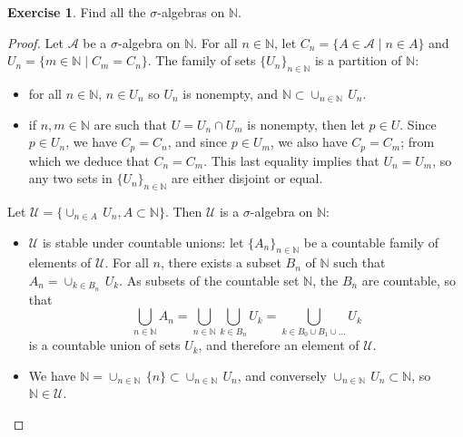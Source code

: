 \documentclass[11pt,a4paper,twoside]{article}
\theoremstyle{definition}
\newcounter{excounter}
\newtheorem{exercise}[excounter]{Exercise}
\begin{document}
\begin{exercise}

  Find all the $\sigma$-algebras on $\mathbb{N}$.

\end{exercise}

\begin{proof}

  Let $\mathscr{A}$ be a $\sigma$-algebra on $\mathbb{N}$. For all $n \in \mathbb{N}$, let
  $C_n = \{ A \in \mathscr{A} \mid n \in A \}$ and $U_n = \{ m \in \mathbb{N} \mid C_m = C_n \}$.
  The family of sets $\{ U_n \}_{n \in \mathbb{N}}$ is a partition of $\mathbb{N}$:
  \begin{itemize}

  \item for all $n \in \mathbb{N}$, $n \in U_n$ so $U_n$ is nonempty, and $\mathbb{N} \subset \cup_{n \in \mathbb{N}} \,U_n$.

  \item if $n, m \in \mathbb{N}$ are such that $U = U_n \cap U_m$ is nonempty, then let $p \in U$. Since $p \in U_n$,
    we have $C_p = C_n$, and since $p \in U_m$, we also have $C_p = C_m$; from which we deduce that $C_n = C_m$.
    This last equality implies that $U_n = U_m$, so any two sets in $\{ U_n \}_{n \in \mathbb{N}}$ are either disjoint or
    equal.

  \end{itemize}

  Let $\mathscr{U} = \{ \cup_{n \in A} \,U_n, A \subset \mathbb{N} \}$. Then $\mathscr{U}$ is a $\sigma$-algebra on $\mathbb{N}$:
  \begin{itemize}

  \item $\mathscr{U}$ is stable under countable unions: let $\{ A_n \}_{n \in \mathbb{N}}$ be a countable family of elements of $\mathscr{U}$.
    For all $n$, there exists a subset $B_n$ of $\mathbb{N}$ such that $A_n = \cup_{k \in B_n} \,U_k$. As subsets of the countable
    set $\mathbb{N}$, the $B_n$ are countable, so that
    \begin{equation*}
      \bigcup_{n \in \mathbb{N}} A_n = \bigcup_{n \in \mathbb{N}} \bigcup_{k \in B_n} U_k = \bigcup_{k \in B_0 \cup B_1 \cup \dotsc} U_k
    \end{equation*}
    is a countable union of sets $U_k$, and therefore an element of $\mathscr{U}$.

  \item We have $\mathbb{N} = \cup_{n \in \mathbb{N}} \,\{ n \} \subset \cup_{n \in \mathbb{N}} \,U_n$, and conversely
    $\cup_{n \in \mathbb{N}} \,U_n \subset \mathbb{N}$, so $\mathbb{N} \in \mathscr{U}$.


\end{itemize}
\end{proof}
\end{document}
